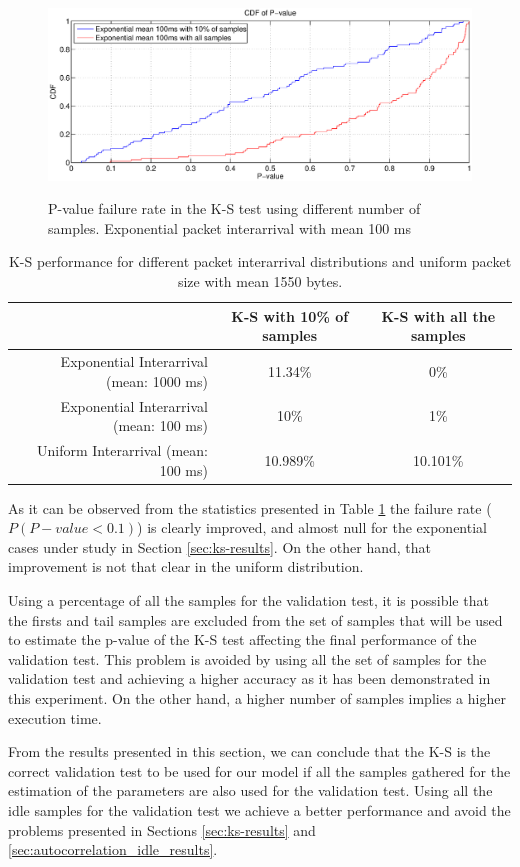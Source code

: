 \begin{figure}[h!]
	\centering
		\includegraphics[width=\textwidth, trim = 0mm 0mm 0mm 0mm, clip]{images/results/GlobalView/KS/ks_optimization/pvalue_exponential100ms}
		\label{fig:ks_optimization_exp100}
	\caption{P-value failure rate in the \acs{K-S} test using different number of samples. Exponential packet interarrival with mean 100 ms}
	\label{fig:ks_optimization}
\end{figure}

\begin{table}[h!]
	\centering
	\begin{tabular}{ r | c | c }
		& \acs{K-S} with 10\% of samples & \acs{K-S} with all the samples \\ \hline
		Exponential Interarrival (mean: 1000 ms) & 11.34\% & 0\% \\ 
		Exponential Interarrival (mean: 100 ms) & 10\% & 1\% \\ 
		Uniform Interarrival (mean: 100 ms) & 10.989\% & 10.101\% \\ 
	\end{tabular}
	\caption{\acs{K-S} performance for different packet interarrival distributions and uniform packet size with mean 1550 bytes.}
	\label{table:KS_optimized}
\end{table}

As it can be observed from the statistics presented in Table \ref{table:KS_optimized} the failure rate ($P(P-value<0.1)$) is clearly improved, and almost null for the exponential cases under study in Section \ref{sec:ks-results}. On the other hand, that improvement is not that clear in the uniform distribution.

Using a percentage of all the samples for the validation test, it is possible that the firsts and tail samples are excluded from the set of samples that will be used to estimate the p-value of the \acs{K-S} test affecting the final performance of the validation test. This problem is avoided by using all the set of samples for the validation test and achieving a higher accuracy as it has been demonstrated in this experiment. On the other hand, a higher number of samples implies a higher execution time.

From the results presented in this section, we can conclude that the \acs{K-S} is the correct validation test to be used for our model if all the samples gathered for the estimation of the parameters are also used for the validation test. Using all the idle samples for the validation test we achieve a better performance and avoid the problems presented in Sections \ref{sec:ks-results} and \ref{sec:autocorrelation_idle_results}.
